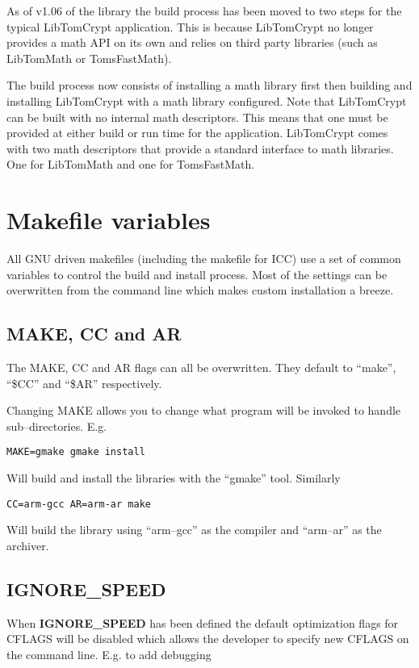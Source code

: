 \documentclass[a4paper]{book}
\begin{document}
As of v1.06 of the library the build process has been moved to two steps for the typical LibTomCrypt application.  This is because
LibTomCrypt no longer provides a math API on its own and relies on third party libraries (such as LibTomMath or TomsFastMath).

The build process now consists of installing a math library first then building and installing LibTomCrypt with a math library
configured.  Note that LibTomCrypt can be built with no internal math descriptors.  This means that one must be provided at either
build or run time for the application.  LibTomCrypt comes with two math descriptors that provide a standard interface to math 
libraries.  One for LibTomMath and one for TomsFastMath.

\section{Makefile variables}

All GNU driven makefiles (including the makefile for ICC) use a set of common variables to control the build and install process.  Most of the 
settings can be overwritten from the command line which makes custom installation a breeze.

\subsection{MAKE, CC and AR}
The MAKE, CC and AR flags can all be overwritten.  They default to ``make'', ``\$CC'' and ``\$AR'' respectively.  

Changing MAKE allows you to change what program will be invoked to handle sub--directories.  E.g.

\begin{verbatim}
MAKE=gmake gmake install
\end{verbatim}

Will build and install the libraries with the ``gmake'' tool.  Similarly

\begin{verbatim}
CC=arm-gcc AR=arm-ar make 
\end{verbatim}

Will build the library using ``arm--gcc'' as the compiler and ``arm--ar'' as the archiver.

\subsection{IGNORE\_SPEED}
When \textbf{IGNORE\_SPEED} has been defined the default optimization flags for CFLAGS will be disabled which allows the developer to specify new
CFLAGS on the command line.  E.g. to add debugging
\end{document}
